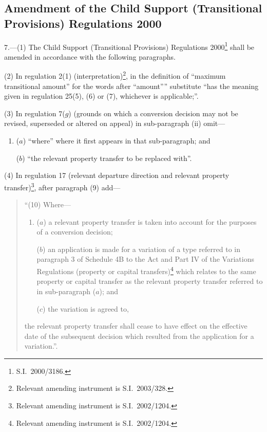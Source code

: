 \documentclass[12pt,a4paper]{article}
\begin{document}
\subsection[7. Amendment of the Child Support (Transitional Provisions) Regulations 2000]{Amendment of the Child Support (Transitional Provisions) Regulations 2000}

7.---(1)  The Child Support (Transitional Provisions) Regulations 2000\footnote{S.I.\ 2000/3186.} shall be amended in accordance with the following paragraphs.

(2) In regulation 2(1) (interpretation)\footnote{Relevant amending instrument is S.I.\ 2003/328.}, in the definition of “maximum transitional amount” for the words after “amount”” substitute “has the meaning given in regulation 25(5), (6) or (7), whichever is applicable;”.

(3) In regulation 7($g$)  (grounds on which a conversion decision may not be revised, superseded or altered on appeal) in sub-paragraph (ii)  omit—
\begin{enumerate}\item[]
($a$) “where” where it first appears in that sub-paragraph; and

($b$) “the relevant property transfer to be replaced with”.
\end{enumerate}

(4) In regulation 17 (relevant departure direction and relevant property transfer)\footnote{Relevant amending instrument is S.I.\ 2002/1204.}, after paragraph (9) add—
\begin{quotation}
“(10) Where—
\begin{enumerate}\item[]
($a$) a relevant property transfer is taken into account for the purposes of a conversion decision;

($b$) an application is made for a variation of a type referred to in paragraph 3 of Schedule 4B to the Act and Part IV of the Variations Regulations (property or capital transfers)\footnote{Relevant amending instrument is S.I.\ 2002/1204.} which relates to the same property or capital transfer as the relevant property transfer referred to in sub-paragraph ($a$); and

($c$) the variation is agreed to,
\end{enumerate}
the relevant property transfer shall cease to have effect on the effective date of the subsequent decision which resulted from the application for a variation.”.
\end{quotation}
\end{document}
